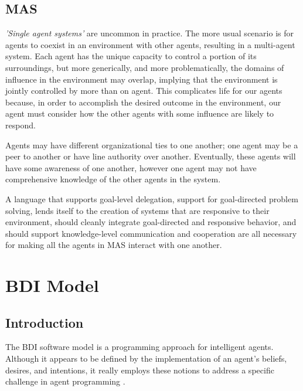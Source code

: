 \subsection{MAS}
\textit{'Single agent systems'} are uncommon in practice. The more usual scenario is for agents to coexist in an environment with other agents, resulting in a multi-agent system.
Each agent has the unique capacity to control a portion of its surroundings, but more generically, and more problematically, the domains of influence in the environment may overlap, implying that the environment is jointly controlled by more than on agent. This complicates life for our agents because, in order to accomplish the desired outcome in the environment, our agent must consider how the other agents with some influence are likely to respond.

\vspace{.5cm}

Agents may have different organizational ties to one another; one agent may be a peer to another or have line authority over another. Eventually, these agents will have some awareness of one another, however one agent may not have comprehensive knowledge of the other agents in the system.

\vspace{.5cm}

A language that supports goal-level delegation, support for goal-directed problem solving, lends itself to the creation of systems that are responsive to their environment, should cleanly integrate goal-directed and responsive behavior, and should support knowledge-level communication and cooperation are all necessary for making all the agents in MAS interact with one another.

\section{\ac{BDI} Model}

\subsection{Introduction}

The \ac{BDI} software model is a programming approach for intelligent agents. Although it appears to be defined by the implementation of an agent's beliefs, desires, and intentions, it really employs these notions to address a specific challenge in agent programming \cite{ap}. 

\vspace{.5cm}

